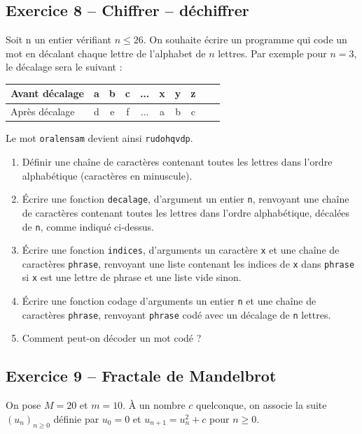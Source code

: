 \documentclass[10pt,fleqn]{article} %
\begin{document}
\begin{multicols}{2}
\subsection*{Exercice 8 -- Chiffrer -- déchiffrer}
Soit n un entier vérifiant $n \leq 26$. On souhaite écrire un programme qui code un mot en décalant chaque lettre de l'alphabet de $n$ lettres.
Par exemple pour $n = 3$, le décalage sera le suivant :
\begin{center}
\begin{tabular}{|l|c|c|c|c|c|c|c|c|c|}
\hline
Avant décalage & a & b & c & ... & x & y & z \\
\hline
Après décalage & d & e & f & ... & a & b & c \\
\hline
\end{tabular}
\end{center}
Le mot \texttt{oralensam} devient ainsi \texttt{rudohqvdp}.
\begin{enumerate}
\item Définir une chaîne de caractères contenant toutes les lettres dans l’ordre alphabétique (caractères en
minuscule).
\item Écrire une fonction \texttt{decalage}, d’argument un entier \texttt{n}, renvoyant une chaîne de caractères contenant
toutes les lettres dans l’ordre alphabétique, décalées de \texttt{n}, comme indiqué ci-dessus.
\item Écrire une fonction \texttt{indices}, d’arguments un caractère \texttt{x} et une chaîne de caractères \texttt{phrase}, renvoyant
une liste contenant les indices de \texttt{x} dans \texttt{phrase} si \texttt{x} est une lettre de phrase et une liste vide sinon.
\item Écrire une fonction codage d’arguments un entier \texttt{n} et une chaîne de caractères \texttt{phrase}, renvoyant
\texttt{phrase} codé avec un décalage de \texttt{n} lettres.
\item Comment peut-on décoder un mot codé ?
\end{enumerate}



\subsection*{Exercice 9 -- Fractale de Mandelbrot}

On pose $M = 20$ et $m = 10$. À un nombre $c$ quelconque, on associe la suite $(u_n)_{n\geq 0}$ définie par $u_0 = 0$ et $u_{n+1} = u_n^2 + c$ pour $n \geq 0$.


\end{multicols}
\end{document}
